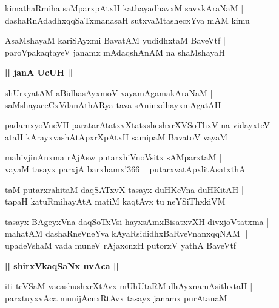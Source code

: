 \documentclass[twoside,12pt,openright]{book}
\newcounter{shloka}[chapter]
\def\uvaca#1{\centerline{{\large\textbf{#1}}}}
\begin{document}
\begin{shloka}%
kimathaRmiha saMparxpAtxH kathayadhavxM savxkAraNaM |\\
dashaRnAdadhxqqSaTxmanasaH sutxvaMtashecxYva mAM kimu
\end{shloka}

\begin{shloka}%
AsaMshayaM kariSAyxmi BavatAM yudidhxtaM BaveVtf |\\
paroVpakaqtayeV janamx mAdaqshAnAM na shaMshayaH
\end{shloka}

\uvaca{|| janA UcUH ||}

\begin{shloka}%
shUrxyatAM aBidhasAyxmoV vayamAgamakAraNaM |\\
saMshayaceCxVdanAthARya tava sAninxdhayxmAgatAH
\end{shloka}

\begin{shloka}%
padamxyoVneVH paratarAtatxvXtatxsheshxrXVSoThxV na vidayxteV |\\
ataH kArayxvashAtApxrXpAtxH samipaM BavatoV vayaM 
\end{shloka}

\begin{shloka}%
mahivjinAnxma rAjAsw putarxhiVnoVsitx sAMparxtaM |\\
vayaM tasayx parxjA barxhamx\char'366 ~ putarxvatApxlitAsatxthA 
\end{shloka}

\begin{shloka}%
taM putarxrahitaM daqSATxvX tasayx duHKeVna duHKitAH |\\
tapaH katuRmihayAtA matiM kaqtAvx tu neYSiThxkiVM 
\end{shloka}

\begin{shloka}%
tasayx BAgeyxVna daqSoTxVsi hayxsAmxBisatxvXH divxjoVtatxma |\\
mahatAM dashaRneVneYva kAyaRsididhxBaRveVnanxqqNAM ||\\
upadeVshaM vada muneV rAjaxcnxH putorxV yathA BaveVtf
\end{shloka}

\uvaca{|| shirxVkaqSaNx uvAca ||}

\begin{shloka}%
iti teVSaM vacashushxrXtAvx mUhUtaRM dhAyxnamAsithxtaH |\\
parxtuyxvAca munijAcnxRtAvx tasayx janamx purAtanaM 
\end{shloka}
\end{document}

